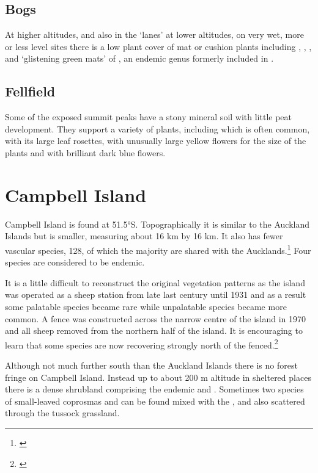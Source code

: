 \subsection{Bogs}

At higher altitudes, and also in the `lanes' at lower altitudes, on very wet, more or less level sites there is a low plant cover of mat or cushion plants including , , ,  and `glistening green mats' of , an endemic genus formerly included in .

\subsection{Fellfield}

Some of the exposed summit peaks have a stony mineral soil with little peat development.
They support a variety of plants, including  which is often common,  with its large leaf rosettes,  with unusually large yellow flowers for the size of the plants and  with brilliant dark blue flowers.

\section{Campbell Island}

Campbell Island is found at 51.5°S.
Topographically it is similar to the Auckland Islands but is smaller, measuring about 16 km by 16 km.
It also has fewer vascular species, 128, of which the majority are shared with the Aucklands.\footnote{\cite{oliver1951botanical}}
Four species are considered to be endemic.

It is a little difficult to reconstruct the original vegetation patterns as the island was operated as a sheep station from late last century until 1931 and as a result some palatable species became rare while unpalatable species became more common.
A fence was constructed across the narrow centre of the island in 1970 and all sheep removed from the northern half of the island.
It is encouraging to learn that some species are now recovering strongly north of the fenced.\footnote{\cite{meurk1982regeneration}}

Although not much further south than the Auckland Islands there is no forest fringe on Campbell Island.
Instead up to about 200 m altitude in sheltered places there is a dense shrubland comprising the endemic  and .
Sometimes two species of small-leaved coprosmas and  can be found mixed with the , and also scattered through the tussock grassland.


